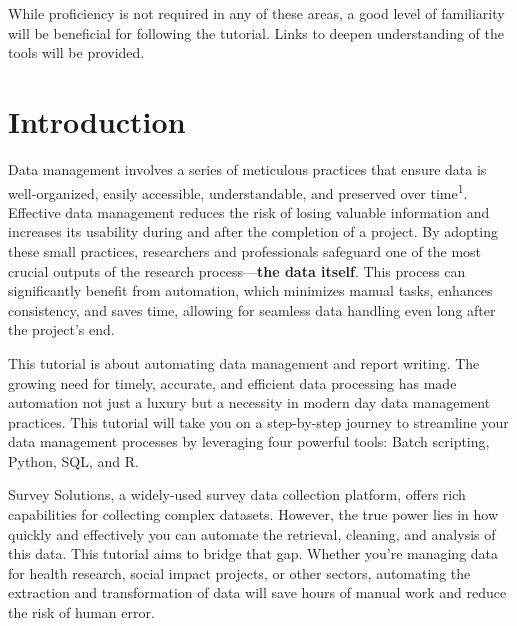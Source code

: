 \documentclass[
  letterpaper,
  DIV=11,
  numbers=noendperiod]{scrreprt}
\begin{document}
\begin{tcolorbox}[enhanced jigsaw, toptitle=1mm, opacitybacktitle=0.6, leftrule=.75mm, opacityback=0, colback=white, left=2mm, colbacktitle=quarto-callout-note-color!10!white, colframe=quarto-callout-note-color-frame, title=\textcolor{quarto-callout-note-color}{\faInfo}\hspace{0.5em}{Note}, titlerule=0mm, coltitle=black, arc=.35mm, bottomrule=.15mm, breakable, bottomtitle=1mm, toprule=.15mm, rightrule=.15mm]

While proficiency is not required in any of these areas, a good level of
familiarity will be beneficial for following the tutorial. Links to
deepen understanding of the tools will be provided.

\end{tcolorbox}


\chapter{Introduction}\label{introduction}

Data management involves a series of meticulous practices that ensure
data is well-organized, easily accessible, understandable, and preserved
over time\textsuperscript{1}. Effective data management reduces the risk
of losing valuable information and increases its usability during and
after the completion of a project. By adopting these small practices,
researchers and professionals safeguard one of the most crucial outputs
of the research process---\textbf{the data itself}. This process can
significantly benefit from automation, which minimizes manual tasks,
enhances consistency, and saves time, allowing for seamless data
handling even long after the project's end.

This tutorial is about automating data management and report writing.
The growing need for timely, accurate, and efficient data processing has
made automation not just a luxury but a necessity in modern day data
management practices. This tutorial will take you on a step-by-step
journey to streamline your data management processes by leveraging four
powerful tools: Batch scripting, Python, SQL, and R.

Survey Solutions, a widely-used survey data collection platform, offers
rich capabilities for collecting complex datasets. However, the true
power lies in how quickly and effectively you can automate the
retrieval, cleaning, and analysis of this data. This tutorial aims to
bridge that gap. Whether you're managing data for health research,
social impact projects, or other sectors, automating the extraction and
transformation of data will save hours of manual work and reduce the
risk of human error.
\end{document}
